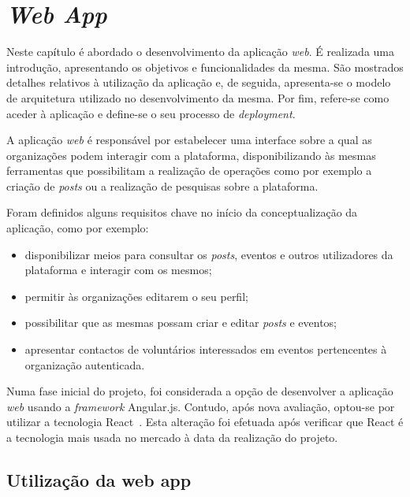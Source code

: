 \section{\textit{Web App}}

Neste capítulo é abordado o desenvolvimento da aplicação \textit{web}. É realizada uma introdução, apresentando os objetivos e funcionalidades da mesma. São mostrados detalhes relativos à utilização da aplicação e, de seguida, apresenta-se o modelo de arquitetura utilizado no desenvolvimento da mesma. Por fim, refere-se como aceder à aplicação e define-se o seu processo de \textit{deployment}.

\par \smallskip

A aplicação \textit{web} é responsável por estabelecer uma interface sobre a qual as organizações podem interagir com a plataforma, disponibilizando às mesmas ferramentas que possibilitam a realização de operações como por exemplo a criação de \textit{posts} ou a realização de pesquisas sobre a plataforma.

\par \smallskip

Foram definidos alguns requisitos chave no início da conceptualização da aplicação, como por exemplo:

\begin{itemize}
	\item disponibilizar meios para consultar os \textit{posts}, eventos e outros utilizadores da plataforma e interagir com os mesmos; 
	\item permitir às organizações editarem o seu perfil;
	\item possibilitar que as mesmas possam criar e editar \textit{posts} e eventos;
	\item apresentar contactos de voluntários interessados em eventos pertencentes à organização autenticada.
\end{itemize}

Numa fase inicial do projeto, foi considerada a opção de desenvolver a aplicação \textit{web} usando a \textit{framework} Angular.js. Contudo, após nova avaliação, optou-se por utilizar a tecnologia React~\cite{Stefanov2016}. Esta alteração foi efetuada após verificar que React é a tecnologia mais usada no mercado à data da realização do projeto. 

\subsection{Utilização da web app}

